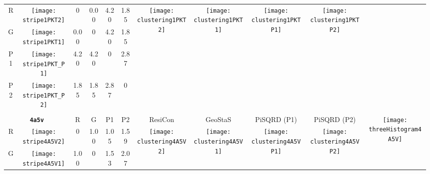 \documentclass[a4paper,11pt,twoside]{book}%
\begin{document}
\begin{appendices}
\begin{sidewaystable}[h!]
\begin{tabular*}{4cm}{cc|c|c|c|c|c|c|c|c|c|}
\cline{1-10}
\multicolumn{1}{|c|}{R} & \texttt{[image: stripe1PKT2]} & 0 & 0.00 & 4.20 & 1.85 & \multirow{4}{*}{\vspace{-0.3cm}\texttt{[image: clustering1PKT2]}} & \multirow{4}{*}{\vspace{-0.3cm}\texttt{[image: clustering1PKT1]}} & \multirow{4}{*}{\vspace{-0.3cm}\texttt{[image: clustering1PKTP1]}} & \multirow{4}{*}{\vspace{-0.3cm}\texttt{[image: clustering1PKTP2]}} &  \multirow{5}{*}{} \\
\cline{1-6}
\multicolumn{1}{|c|}{G} & \texttt{[image: stripe1PKT1]} & 0.00 & 0 & 4.20 & 1.85 & \multirow{4}{*}{} & \multirow{4}{*}{} & \multirow{4}{*}{} & \multirow{4}{*}{} & \multirow{5}{*}{} \\
\cline{1-6}
\multicolumn{1}{|c|}{P1} & \texttt{[image: stripe1PKT\_P1]} & 4.20 & 4.20 & 0 & 2.87 & \multirow{4}{*}{} & \multirow{4}{*}{} & \multirow{4}{*}{} & \multirow{4}{*}{} & \multirow{5}{*}{}  \\
\cline{1-6}
\multicolumn{1}{|c|}{P2} & \texttt{[image: stripe1PKT\_P2]} & 1.85 & 1.85 & 2.87 & 0 & \multirow{4}{*}{} & \multirow{4}{*}{} & \multirow{4}{*}{} & \multirow{4}{*}{} & \multirow{5}{*}{}  \\
\cline{1-11}
\\
\cline{1-11}
\multicolumn{2}{|c|}{{\bf \texttt{4a5v}}} & R & G & P1 & P2 & ResiCon & GeoStaS & PiSQRD (P1) & PiSQRD (P2) & \multirow{5}{*}{\vspace{-0.15cm}\texttt{[image: threeHistogram4A5V]}}  \\
\cline{1-10}
\multicolumn{1}{|c|}{R} & \texttt{[image: stripe4A5V2]} & 0 & 1.00 & 1.05 & 1.59 & \multirow{4}{*}{\vspace{-0.3cm}\texttt{[image: clustering4A5V2]}} & \multirow{4}{*}{\vspace{-0.3cm}\texttt{[image: clustering4A5V1]}} & \multirow{4}{*}{\vspace{-0.3cm}\texttt{[image: clustering4A5VP1]}} & \multirow{4}{*}{\vspace{-0.3cm}\texttt{[image: clustering4A5VP2]}} &  \multirow{5}{*}{} \\
\cline{1-6}
\multicolumn{1}{|c|}{G} & \texttt{[image: stripe4A5V1]} & 1.00 & 0 & 1.53 & 2.07 & \multirow{4}{*}{} & \multirow{4}{*}{} & \multirow{4}{*}{} & \multirow{4}{*}{} & \multirow{5}{*}{} \\

\end{tabular*}
\end{sidewaystable}
\end{appendices}
\end{document}
